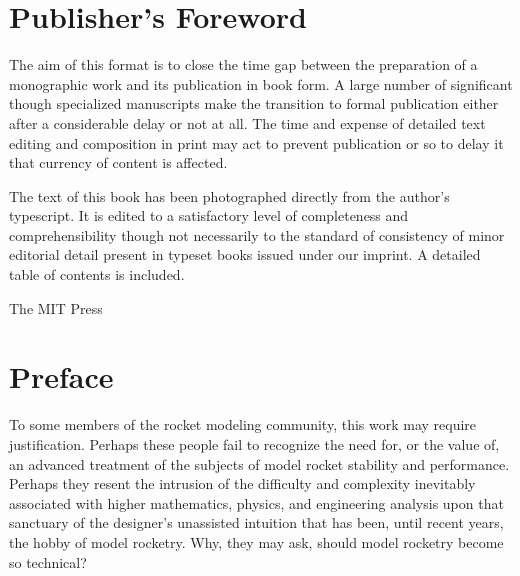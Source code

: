 \chapter{Publisher's Foreword}\label{front:foreword}

The aim of this format is to close the time gap between the preparation of a monographic work and its
publication in book form. A large number of significant though specialized manuscripts make the transition to
formal publication either after a considerable delay or not at all. The time and expense of detailed text
editing and composition in print may act to prevent publication or so to delay it that currency of content is
affected.

The text of this book has been photographed directly from the author's typescript. It is edited to a
satisfactory level of completeness and comprehensibility though not necessarily to the standard of consistency
of minor editorial detail present in typeset books issued under our imprint. A detailed table of contents is
included.

\begin{flushright}
  The MIT Press\hspace*{3em}
\end{flushright}

\chapter{Preface}\label{front:preface}

To some members of the rocket modeling community, this work may require justification. Perhaps these people
fail to recognize the need for, or the value of, an advanced treatment of the subjects of model rocket
stability and performance. Perhaps they resent the intrusion of the difficulty and complexity inevitably
associated with higher mathematics, physics, and engineering analysis upon that sanctuary of the designer's
unassisted intuition that has been, until recent years, the hobby of model rocketry. Why, they may ask, should
model rocketry become so technical?

